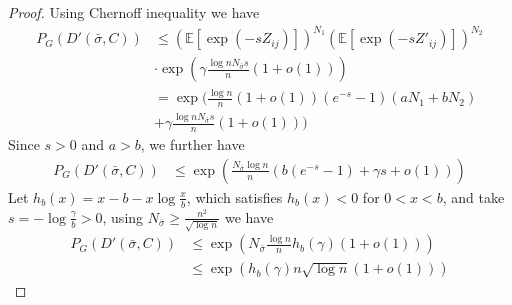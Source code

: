 \documentclass[journal]{IEEEtran}
\newcommand{\1}{\mathbbm{1}}
\begin{document}
\begin{proof}
	Using Chernoff inequality we have
	\begin{align*}
	P_G(D'(\bar{\sigma}, C))&
	\leq (\mathbb{E}[\exp(-s Z_{ij})])^{N_1} (\mathbb{E}[\exp(-s Z'_{ij})])^{N_2} \\
	&\cdot \exp(\gamma \frac{\log n N_{\bar{\sigma}} s}{n}(1+o(1))) \\
	&= \exp \Big( \frac{\log n}{n}(1+o(1))(e^{-s}-1)(aN_1 + bN_2) \\
	&+\gamma \frac{\log n N_{\bar{\sigma}} s}{n}(1+o(1))\Big)
	\end{align*}
	Since $s > 0$ and $a>b$, we further have
	\begin{align*}
	P_G(D'(\bar{\sigma}, C))
	& \leq \exp( \frac{N_{\bar{\sigma}}\log n }{n}(b(e^{-s}-1)+ \gamma s + o(1))) 
	\end{align*}
	Let $h_b(x) = x - b -x\log \frac{x}{b}$, which satisfies $h_b(x) < 0$ for $0<x<b$,
	and take $s=-\log\frac{\gamma}{b} > 0$, using 
	$N_{\bar{\sigma}} \geq \frac{n^2}{\sqrt{\log n}}$ we have
	\begin{align*}
	P_G(D'(\bar{\sigma}, C))&\leq \exp( N_{\bar{\sigma}} \frac{\log n}{n} h_b(\gamma)(1+o(1))) \\
	& \leq \exp (h_b(\gamma) n \sqrt{\log n} (1+o(1)))
	\end{align*}
\end{proof}
\end{document}
